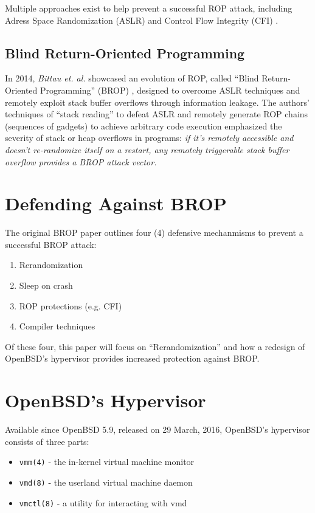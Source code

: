 \documentclass[conference]{IEEEtran}
\begin{document}
Multiple approaches exist to help prevent a successful ROP attack,
including Adress Space Randomization (ASLR) and Control Flow Integrity
(CFI) \cite{b4}.

\subsection{Blind Return-Oriented Programming}
In 2014, \emph{Bittau et. al.} showcased an evolution of ROP, called
``Blind Return-Oriented Programming'' (BROP) \cite{b5}, designed to
overcome ASLR techniques and remotely exploit stack buffer overflows
through information leakage. The authors' techniques of ``stack
reading'' to defeat ASLR and remotely generate ROP chains (sequences
of gadgets) to achieve arbitrary code execution emphasized the
severity of stack or heap overflows in programs: \emph{if it's
remotely accessible and doesn't re-randomize itself on a restart, any
remotely triggerable stack buffer overflow provides a BROP attack
vector.}

\section{Defending Against BROP}
The original BROP paper outlines four (4) defensive mechanmisms to
prevent a successful BROP attack:

\begin{enumerate}
\item Rerandomization
\item Sleep on crash
\item ROP protections (e.g. CFI)
\item Compiler techniques
\end{enumerate}

Of these four, this paper will focus on ``Rerandomization'' and how a
redesign of OpenBSD's hypervisor provides increased protection against
BROP.

\section{OpenBSD's Hypervisor}
Available since OpenBSD 5.9, released on 29 March, 2016, OpenBSD's
hypervisor consists of three parts:

\begin{itemize}
\item \texttt{vmm(4)} - the in-kernel virtual machine monitor
\item \texttt{vmd(8)} - the userland virtual machine daemon
\item \texttt{vmctl(8)} - a utility for interacting with vmd
\end{itemize}
\end{document}

